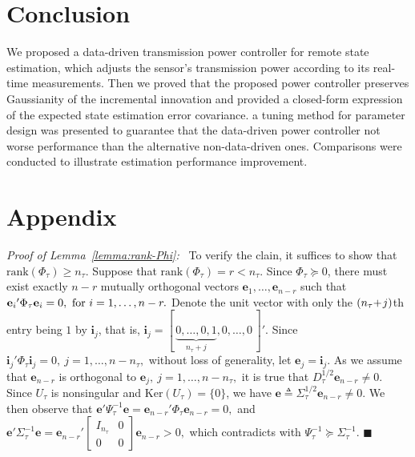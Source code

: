 \documentclass[twocolumn]{autart}    \usepackage{cite}
\begin{document}
{{\section{Conclusion}\label{sec:conculsion}
We proposed a data-driven transmission power controller for remote state
estimation, which adjusts the sensor's transmission power according to
its real-time measurements. Then we proved that the proposed power
 controller preserves Gaussianity of the incremental innovation and provided a closed-form
expression of the expected state estimation error covariance.
a tuning method for parameter design was presented to guarantee
that the data-driven power controller
not worse performance than the
alternative non-data-driven ones.
Comparisons were conducted to illustrate estimation performance improvement.

\section*{Appendix}




\textit{Proof of Lemma~\ref{lemma:rank-Phi}:~}
To verify the clain, it
suffices to show that $\mathrm{rank}(\Phi_\tau
)\geq n_\tau$.
Suppose that $\mathrm{rank}(\Phi_\tau
)=r<n_\tau$. Since $\Phi_\tau\succeq 0$,
there must exist exactly $n-r$ mutually orthogonal vectors
$\mathbf{e}_1,\ldots,\mathbf{e}_{n-r}$
such that
${\mathbf{e}_i}'\Phi_\tau\mathbf{e}_i=0,\hbox{~for~}i=1,\ldots,
n-r.$
Denote the unit vector with
only the $(n_\tau\hspace{-0.8mm}+\hspace{-0.5mm}j)$th
entry being $1$ by
$\mathbf{i}_j$, that is,
$\mathbf{i}_j=[\,\underbrace{0,\ldots,0,1}
_{n_\tau+j},0,\ldots,0\,]'.$
Since
${\mathbf{i}_j}'\Phi_\tau\mathbf{i}_j=0,~
j
=1,\ldots,
n-n_\tau,$ without loss of generality, let
$\mathbf{e}_j=\mathbf{i}_{j}$.
As we assume that $\mathbf{e}_{n-r}$ is orthogonal to
$\mathbf{e}_j,~j
=1,\ldots,
n-n_\tau,$
it is true that $D_\tau^{1/2}\mathbf{e}_{n-r}\neq 0$.
Since $U_\tau$ is nonsingular and $\mathrm{Ker}(U_\tau)
=\{0\}$,
we have $\mathbf{e}\triangleq\Sigma_\tau^{1/2}\mathbf{e}_{n-r}\neq 0$.
We then observe that
$\mathbf{e}'\Psi_\tau^{-1}\mathbf{e}=
{\mathbf{e}_{n-r}}'\Phi_\tau\mathbf{e}
_{n-r}=0,$
and
$
\mathbf{e}'\Sigma_\tau^{-1}\mathbf{e}=
{\mathbf{e}_{n-r}}'\left[
\begin{array}{cc}
I_{n_\tau} & 0\\
0& 0\end{array}\right]\mathbf{e}_{n-r}>0,
$
which contradicts with $\Psi_\tau^{-1}\succeq
\Sigma_\tau^{-1}$.
\hfill$\blacksquare$


}}
\end{document}
